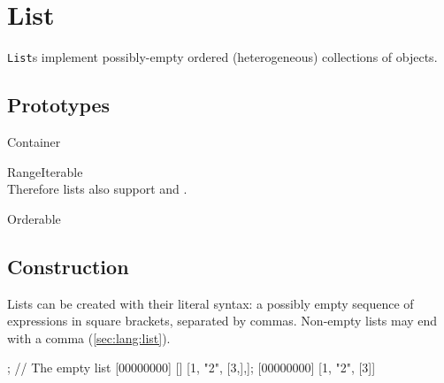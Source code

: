 
\section{List}

\lstinline|List|s implement possibly-empty ordered (heterogeneous)
collections of objects.

\subsection{Prototypes}

\begin{refObjects}
\item[Container]
\item[RangeIterable]~\\
  Therefore lists also support  and
  .


\item[Orderable]
\end{refObjects}

\subsection{Construction}

Lists can be created with their literal syntax: a possibly empty sequence of
expressions in square brackets, separated by commas.  Non-empty lists may
end with a comma (\autoref{sec:lang:list}).

\begin{urbiscript}
[]; // The empty list
[00000000] []
[1, "2", [3,],];
[00000000] [1, "2", [3]]
\end{urbiscript}

